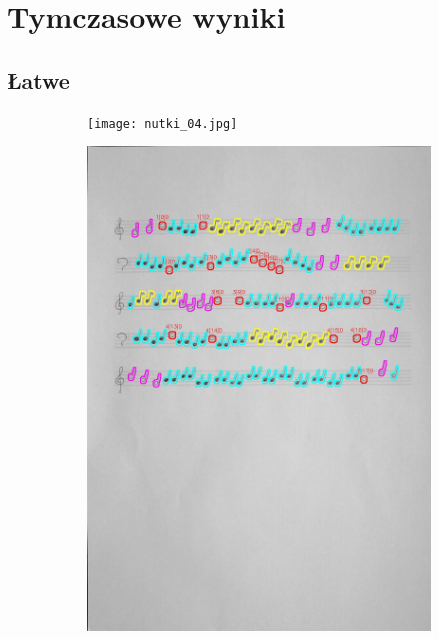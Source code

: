 \documentclass[11pt]{article}
\begin{document}
\section{Tymczasowe wyniki}

\subsection{Łatwe}

\begin{figure}[H]
    \centering
    \begin{subfigure}{.5\textwidth}
        \centering
        \graphicspath{ {Resources/} }
        \texttt{[image: nutki\_04.jpg]}
        \label{fig:sub1}
    \end{subfigure}%
    \begin{subfigure}{.5\textwidth}
        \centering
        \graphicspath{ {blobs/} }
        \includegraphics[width=\linewidth]{4_cnts.jpg}
        \label{fig:sub2}
    \end{subfigure}
    \label{fig:test}
\end{figure}
\end{document}
